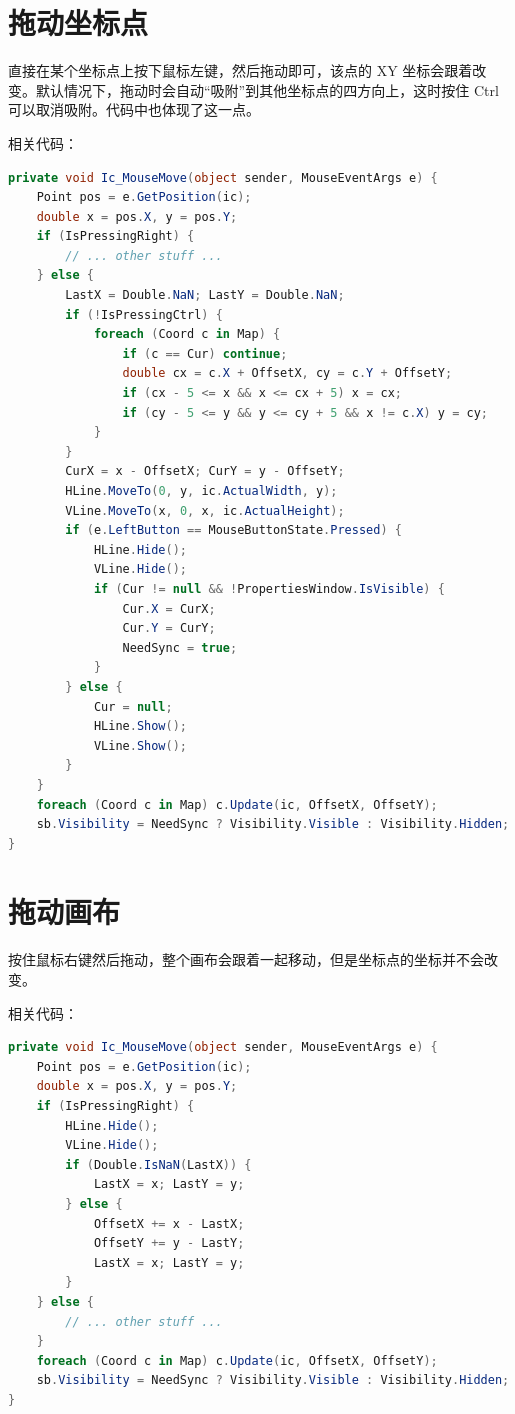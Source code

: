 \section{拖动坐标点}

直接在某个坐标点上按下鼠标左键，然后拖动即可，该点的 XY 坐标会跟着改变。默认情况下，拖动时会自动``吸附''到其他坐标点的四方向上，这时按住 Ctrl 可以取消吸附。代码中也体现了这一点。

相关代码：

\begin{lstlisting}[language=cs]
private void Ic_MouseMove(object sender, MouseEventArgs e) {
    Point pos = e.GetPosition(ic);
    double x = pos.X, y = pos.Y;
    if (IsPressingRight) {
        // ... other stuff ...
    } else {
        LastX = Double.NaN; LastY = Double.NaN;
        if (!IsPressingCtrl) {
            foreach (Coord c in Map) {
                if (c == Cur) continue;
                double cx = c.X + OffsetX, cy = c.Y + OffsetY;
                if (cx - 5 <= x && x <= cx + 5) x = cx;
                if (cy - 5 <= y && y <= cy + 5 && x != c.X) y = cy;
            }
        }
        CurX = x - OffsetX; CurY = y - OffsetY;
        HLine.MoveTo(0, y, ic.ActualWidth, y);
        VLine.MoveTo(x, 0, x, ic.ActualHeight);
        if (e.LeftButton == MouseButtonState.Pressed) {
            HLine.Hide();
            VLine.Hide();
            if (Cur != null && !PropertiesWindow.IsVisible) {
                Cur.X = CurX;
                Cur.Y = CurY;
                NeedSync = true;
            }
        } else {
            Cur = null;
            HLine.Show();
            VLine.Show();
        }
    }
    foreach (Coord c in Map) c.Update(ic, OffsetX, OffsetY);
    sb.Visibility = NeedSync ? Visibility.Visible : Visibility.Hidden;
}
\end{lstlisting}

\section{拖动画布}

按住鼠标右键然后拖动，整个画布会跟着一起移动，但是坐标点的坐标并不会改变。

相关代码：

\begin{lstlisting}[language=cs]
private void Ic_MouseMove(object sender, MouseEventArgs e) {
    Point pos = e.GetPosition(ic);
    double x = pos.X, y = pos.Y;
    if (IsPressingRight) {
        HLine.Hide();
        VLine.Hide();
        if (Double.IsNaN(LastX)) {
            LastX = x; LastY = y;
        } else {
            OffsetX += x - LastX;
            OffsetY += y - LastY;
            LastX = x; LastY = y;
        }
    } else {
        // ... other stuff ...
    }
    foreach (Coord c in Map) c.Update(ic, OffsetX, OffsetY);
    sb.Visibility = NeedSync ? Visibility.Visible : Visibility.Hidden;
}
\end{lstlisting}

